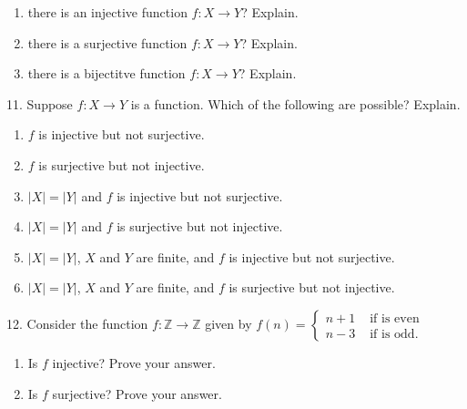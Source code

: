 \documentclass[10pt,]{book}
\theoremstyle{plain}
\theoremstyle{definition}
\theoremstyle{definition}
\theoremstyle{definition}
\numberwithin{equation}{section}
\def\Z{\mathbb Z}
\newcommand{\amp}{ & }
\begin{document}
\begin{exerciselist}
\begin{enumerate}[label=(\alph*)]
\item\hypertarget{li-345}{}
                there is an injective function \(f:X \to Y\)? Explain.
\item\hypertarget{li-346}{}
                there is a surjective function \(f:X \to Y\)? Explain.
\item\hypertarget{li-347}{}
                there is a bijectitve function \(f:X \to Y\)? Explain.
\end{enumerate}
\par\smallskip
\item[11.]\hypertarget{exercise-37}{}
            Suppose \(f:X \to Y\) is a function. Which of the following are possible? Explain.
\leavevmode%
\begin{enumerate}[label=(\alph*)]
\item\hypertarget{li-351}{}\(f\) is injective but not surjective.%
\item\hypertarget{li-352}{}\(f\) is surjective but not injective.%
\item\hypertarget{li-353}{}\(|X| = |Y|\) and \(f\) is injective but not surjective.%
\item\hypertarget{li-354}{}\(|X| = |Y|\) and \(f\) is surjective but not injective.%
\item\hypertarget{li-355}{}\(|X| = |Y|\), \(X\) and \(Y\) are finite, and \(f\) is injective but not surjective.%
\item\hypertarget{li-356}{}\(|X| = |Y|\), \(X\) and \(Y\) are finite, and \(f\) is surjective but not injective.%
\end{enumerate}
\par\smallskip
\item[12.]\hypertarget{exercise-38}{}
            Consider the function \(f:\Z \to \Z\) given by \(f(n) = \begin{cases}n+1 \amp  \mbox{ if  is even} \\ n-3 \amp \mbox{ if  is odd} . \end{cases}
            \)
\leavevmode%
\begin{enumerate}[label=(\alph*)]
\item\hypertarget{li-363}{}
                Is \(f\) injective? Prove your answer.
\item\hypertarget{li-364}{}
                Is \(f\) surjective? Prove your answer.
\end{enumerate}

\end{exerciselist}
\end{document}
